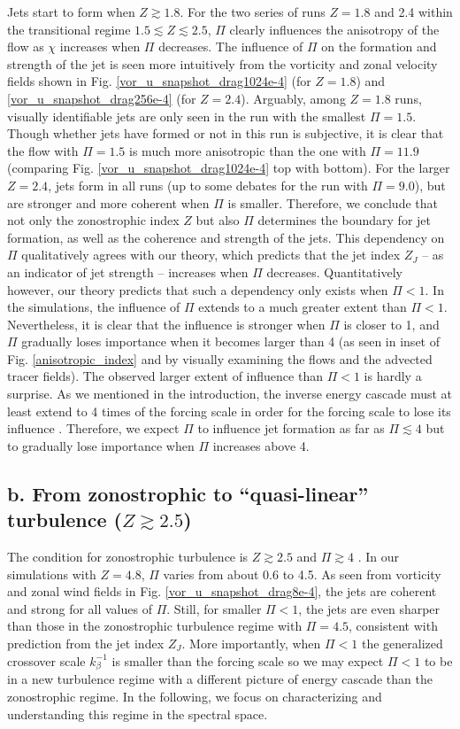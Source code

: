 \documentclass{ametsoc}
\begin{document}
Jets start to form when $Z\apprge1.8$. For the two series of runs
$Z=1.8$ and 2.4 within the transitional regime $1.5\apprle Z\apprle2.5$,
$\Pi$ clearly influences the anisotropy of the flow as $\chi$ increases
when $\Pi$ decreases. The influence of $\Pi$ on the formation and
strength of the jet is seen more intuitively from the vorticity and zonal
velocity fields shown in Fig. \ref{vor_u_snapshot_drag1024e-4} (for
$Z=1.8$) and \ref{vor_u_snapshot_drag256e-4} (for $Z=2.4$). Arguably,
among $Z=1.8$ runs, visually identifiable jets are only seen in the
run with the smallest $\Pi=1.5$. Though whether jets have formed
or not in this run is subjective, it is clear that the flow with $\Pi=1.5$
is much more anisotropic than the one with $\Pi=11.9$ (comparing
Fig. \ref{vor_u_snapshot_drag1024e-4} top with bottom). For the larger
$Z=2.4$, jets form in all runs (up to some debates for the run with
$\Pi=9.0$), but are stronger and more coherent when $\Pi$ is
smaller. Therefore, we conclude that not only the zonostrophic index
$Z$ but also $\Pi$ determines the boundary for jet formation, as
well as the coherence and strength of the jets. This dependency on
$\Pi$ qualitatively agrees with our theory, which predicts that the
jet index $Z_{J}$ -- as an indicator of jet strength -- increases
when $\Pi$ decreases. Quantitatively however, our theory predicts that
such a dependency only exists when $\Pi<1$. In the simulations, the
influence of $\Pi$ extends to a much greater extent than $\Pi<1$.
Nevertheless, it is clear that the influence is stronger
when $\Pi$ is closer to 1, and $\Pi$ gradually loses importance
when it becomes larger than 4 (as seen in inset of Fig. \ref{anisotropic_index}
and by visually examining the flows and the advected tracer fields).
The observed larger extent of influence than $\Pi<1$ is hardly a
surprise. As we mentioned in the introduction, the inverse energy cascade
must at least extend to 4 times of the forcing scale in order for
the forcing scale to lose its influence \citep{Chen2006}. Therefore,
we expect $\Pi$ to influence jet formation as far as $\Pi\apprle4$
but to gradually lose importance when $\Pi$ increases above 4.


\subsection*{b. From zonostrophic to ``quasi-linear'' turbulence ($Z\apprge2.5$)}

The condition for zonostrophic turbulence is $Z\apprge2.5$ and $\Pi\apprge4$
\citep{Sukoriansky2007,Galperin2010}. In our simulations with $Z=4.8$,
$\Pi$ varies from about 0.6 to 4.5. As seen from vorticity and zonal
wind fields in Fig. \ref{vor_u_snapshot_drag8e-4}, the jets are coherent
and strong for all values of $\Pi$. Still, for smaller $\Pi<1$,
the jets are even sharper than those in the zonostrophic turbulence
regime with $\Pi=4.5$, consistent with prediction from the jet index
$Z_{J}$. More importantly, when $\Pi<1$ the generalized crossover
scale $k_{\beta}^{-1}$ is smaller than the forcing scale so we may expect
$\Pi<1$ to be in a new turbulence regime with a different picture of
energy cascade than the zonostrophic regime. In the following, we
focus on characterizing and understanding this regime in the spectral
space.
\end{document}
